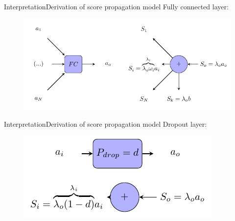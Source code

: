 \documentclass{beamer}
\begin{document}
\begin{frame}{Interpretation}{Derivation of score propagation model}
		\alert{Fully connected layer:}
		\begin{figure}
			\centering
			\includegraphics[scale=0.95]{./chapter_interpretation/score_fc.pdf}
		\end{figure}
\end{frame}

\begin{frame}{Interpretation}{Derivation of score propagation model}
\alert{Dropout layer:}
\begin{figure}
	\centering
	\includegraphics[scale=0.95]{./chapter_interpretation/score_dropout.pdf}
\end{figure}
\end{frame}
\end{document}
